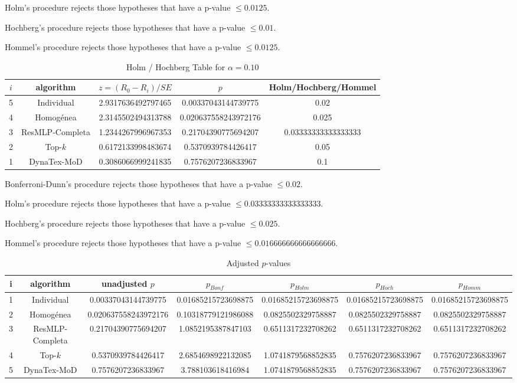 \documentclass[a4paper,10pt]{article}
\begin{document}
\begin{landscape}
Holm's procedure rejects those hypotheses that have a p-value $\le0.0125$.


Hochberg's procedure rejects those hypotheses that have a p-value $\le0.01$.


Hommel's procedure rejects those hypotheses that have a p-value $\le0.0125$.


\begin{table}[!htp]
\centering\tiny
\caption{Holm / Hochberg Table for $\alpha=0.10$}
\begin{tabular}{ccccc}
$i$&algorithm&$z=(R_0 - R_i)/SE$&$p$&Holm/Hochberg/Hommel\\
\hline
5&Individual&2.9317636492797465&0.00337043144739775&0.02\\
4&Homogénea&2.3145502494313788&0.020637558243972176&0.025\\
3&ResMLP-Completa&1.2344267996967353&0.21704390775694207&0.03333333333333333\\
2&Top-$k$&0.6172133998483674&0.5370939784426417&0.05\\
1&DynaTex-MoD&0.3086066999241835&0.7576207236833967&0.1\\
\hline
\end{tabular}
\end{table}
Bonferroni-Dunn's procedure rejects those hypotheses that have a p-value $\le0.02$.


Holm's procedure rejects those hypotheses that have a p-value $\le0.03333333333333333$.


Hochberg's procedure rejects those hypotheses that have a p-value $\le0.025$.


Hommel's procedure rejects those hypotheses that have a p-value $\le0.016666666666666666$.


\begin{table}[!htp]
\centering\tiny
\caption{Adjusted $p$-values}
\begin{tabular}{ccccccc}
i&algorithm&unadjusted $p$&$p_{Bonf}$&$p_{Holm}$&$p_{Hoch}$&$p_{Homm}$\\
\hline
1&Individual&0.00337043144739775&0.01685215723698875&0.01685215723698875&0.01685215723698875&0.01685215723698875\\
2&Homogénea&0.020637558243972176&0.10318779121986088&0.0825502329758887&0.0825502329758887&0.0825502329758887\\
3&ResMLP-Completa&0.21704390775694207&1.0852195387847103&0.6511317232708262&0.6511317232708262&0.6511317232708262\\
4&Top-$k$&0.5370939784426417&2.6854698922132085&1.0741879568852835&0.7576207236833967&0.7576207236833967\\
5&DynaTex-MoD&0.7576207236833967&3.788103618416984&1.0741879568852835&0.7576207236833967&0.7576207236833967\\
\hline
\end{tabular}
\end{table}


\end{landscape}
\end{document}
